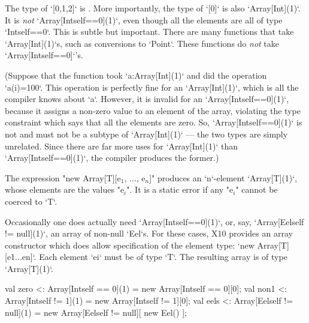 \begin{ex}
The type of
\xcd`[0,1,2]` is .    
More importantly, the type of 
\xcd`[0]` is also \xcd`Array[Int](1)`.  It is {\em not} 
\xcd`Array[Int{self==0}](1)`, even though all the elements are all 
of type \xcd`Int{self==0}`.  This is subtle but important. There are many
functions that take \xcd`Array[Int](1)`s, such as conversions to \xcd`Point`.
These functions do {\em not} take
\xcd`Array[Int{self==0}]`'s.

(Suppose that the function took \xcd`a:Array[Int](1)` and did 
the operation \xcd`a(i)=100`.   This operation is perfectly fine for
an \xcd`Array[Int](1)`, which is all the compiler knows about \xcd`a`.  
However, it is invalid for an \xcd`Array[Int{self==0}](1)`, because it assigns
a non-zero value to an element of the array, violating the type constraint
which says that all the elements are zero.  So, \xcd`Array[Int{self==0}](1)`
is not and must not be a subtype of \xcd`Array[Int](1)` --- the two types are simply unrelated.
Since there are far more uses for \xcd`Array[Int](1)` than
\xcd`Array[Int{self==0}](1)`, the compiler produces the former.)
\end{ex}

The expression \xcdmath"new Array[T][e$_1$, $\ldots$, e$_n$]"
produces 
an \xcd`n`-element \xcd`Array[T](1)`, whose elements are the values
\xcdmath"e$_i$".  It is a static error if any \xcdmath"e$_i$" cannot be
coerced to \xcd`T`.


\begin{ex}
Occasionally one does actually need \xcd`Array[Int{self==0}](1)`, 
or, say, \xcd`Array[Eel{self != null}](1)`, an array of non-null \xcd`Eel`s.  
For these cases, X10 provides an array constructor which does allow
specification of the element type: \xcd`new Array[T][e1...en]`.  Each
element \xcd`ei` must be of type \xcd`T`.  The resulting array is of type
\xcd`Array[T](1)`.  
\begin{xten}
val zero <: Array[Int{self == 0}](1) 
          = new Array[Int{self == 0}][0];
val non1 <: Array[Int{self != 1}](1) 
          = new Array[Int{self != 1}][0];
val eels <: Array[Eel{self != null}](1) 
          = new Array[Eel{self != null}][ new Eel() ];
\end{xten}
\end{ex}


